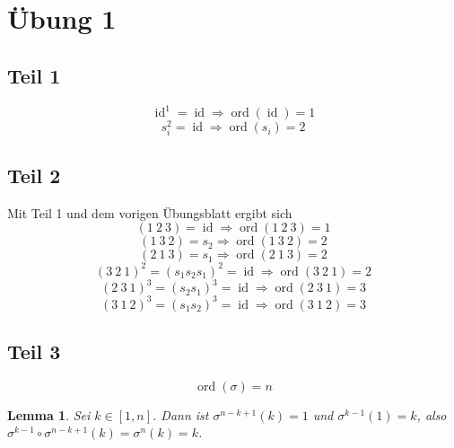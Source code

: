 \documentclass[10pt,a4paper]{article}
\DeclareMathOperator{\ord}{ord}
\DeclareMathOperator{\id}{id}
\newtheorem*{lemma}{Lemma}
\begin{document}
\section*{Übung 1}

\subsection*{Teil 1}

\begin{equation}
\id^{1} = \id \Rightarrow \ord(\id) = 1
\end{equation}
\begin{equation}
s_{i}^{2} = \id \Rightarrow \ord(s_{i}) = 2
\end{equation}

\subsection*{Teil 2}

Mit Teil 1 und dem vorigen Übungsblatt ergibt sich
\begin{equation}
(1\ 2\ 3) = \id \Rightarrow \ord(1\ 2\ 3) = 1
\end{equation}
\begin{equation}
(1\ 3\ 2) = s_{2} \Rightarrow \ord(1\ 3\ 2) = 2
\end{equation}
\begin{equation}
(2\ 1\ 3) = s_{1} \Rightarrow \ord(2\ 1\ 3) = 2
\end{equation}
\begin{equation}
(3\ 2\ 1)^{2} = (s_{1}s_{2}s_{1})^{2} = \id \Rightarrow \ord(3\ 2\ 1) = 2
\end{equation}
\begin{equation}
(2\ 3\ 1)^{3} = (s_{2}s_{1})^{3} = \id \Rightarrow \ord(2\ 3\ 1) = 3
\end{equation}
\begin{equation}
(3\ 1\ 2)^{3} = (s_{1}s_{2})^{3} = \id \Rightarrow \ord(3\ 1\ 2) = 3
\end{equation}

\subsection*{Teil 3}

\begin{equation}
\ord(\sigma) = n
\end{equation}

\begin{lemma}
Sei $k \in [1, n]$.
Dann ist $\sigma^{n - k + 1}(k) = 1$ und $\sigma^{k - 1}(1) = k$, also $\sigma^{k - 1} \circ \sigma^{n - k + 1}(k) = \sigma^{n}(k) = k$.
\end{lemma}
\end{document}
